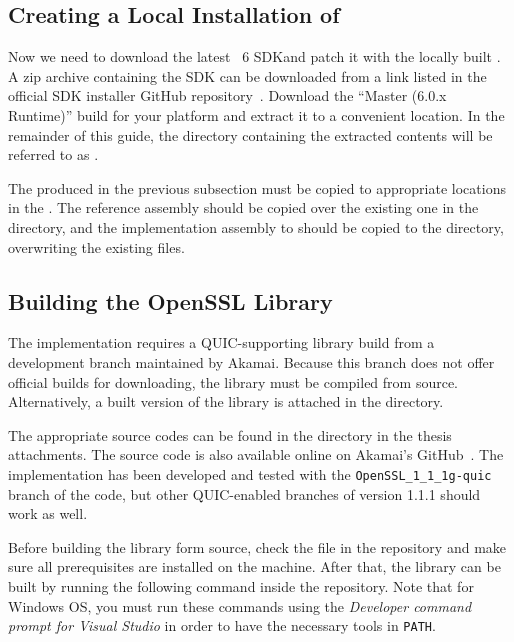 \subsection{Creating a Local Installation of \dotnet{}}\label{sec:06localdotnet}

Now we need to download the latest \dotnet{}~6 SDK\@ and patch it with the locally built
\SystemNetQuicDll{}. A zip archive containing the SDK can be downloaded from a link listed in the
official SDK installer GitHub repository~\cite{dotnetSdkGithub}. Download the ``Master (6.0.x
Runtime)'' build for your platform and extract it to a convenient location. In the remainder of this
guide, the directory containing the extracted contents will be referred to as
.

The \SystemNetQuicDll{} produced in the previous subsection must be copied to appropriate locations
in the . The reference \SystemNetQuicDll{} assembly should be copied over the
existing one in the
 directory, and
the implementation assembly to should be copied to the
 directory, overwriting the
existing files.

\subsection{Building the OpenSSL Library}\label{sec:06openssl}

The implementation requires a QUIC-supporting \libopenssl{} library build from a development branch
maintained by Akamai. Because this branch does not offer official builds for downloading, the
library must be compiled from source. Alternatively, a built version of the library is attached in
the  directory.

The appropriate source codes can be found in the  directory in the thesis
attachments. The source code is also available online on Akamai's GitHub~\cite{AkamaiOpensslGithub}.
The implementation has been developed and tested with the \texttt{OpenSSL_1_1_1g-quic} branch of the
code, but other QUIC-enabled branches of \libopenssl{} version 1.1.1 should work as well.

Before building the \libopenssl{} library form source, check the  file in the
repository and make sure all prerequisites are installed on the machine. After that, the
\libopenssl{} library can be built by running the following command inside the repository. Note that
for Windows OS, you must run these commands using the \textit{Developer command prompt for Visual
  Studio} in order to have the necessary tools in \texttt{PATH}.


